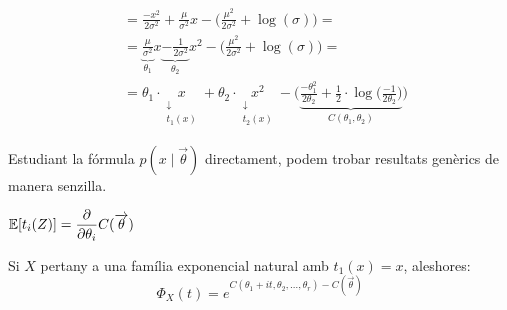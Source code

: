 \begin{example}
\begin{enumerate}
\[\begin{split}
          &= \frac{-x^{2}}{2\sigma^{2}} + \frac{\mu}{\sigma^{2}}x - \Big(\frac{\mu^{2}}{2\sigma^{2}}+\log(\sigma)\Big)= \\
          & = \underbrace{\frac{\mu}{\sigma^{2}}}_{\theta_{1}}x \underbrace{-\frac{1}{2\sigma^{2}}}_{\theta_{2}}x^{2} - \Big(\frac{\mu^{2}}{2\sigma^{2}}+\log(\sigma)\Big)= \\
          &= \theta_{1}\cdot\underset{\substack{\downarrow \\ t_{1}(x)}}{x} + \theta_{2}\cdot\underset{\substack{\downarrow \\ t_{2}(x)}}{x^{2}} - \bigg(\underbrace{\frac{-\theta_{1}^{2}}{2\theta_{2}}+\frac{1}{2}\cdot \log\Big(\frac{-1}{2\theta_{2}}\Big)}_{C(\theta_{1},\theta_{2})}\bigg)
      \end{split}
      \]
  \end{enumerate}
\end{example}

\newpage
Estudiant la fórmula $p(x\mid \overrightarrow{\theta})$ directament, podem trobar resultats genèrics de manera senzilla.

\begin{prop}
  $\mathbb{E}[t_{i}(Z)] = \dfrac{\partial}{\partial \theta_{i}}C(\overrightarrow{\theta})$
\end{prop}

\begin{prop}
  Si $X$ pertany a una família exponencial natural amb $t_{1}(x) = x$, aleshores:
  \[
    \Phi_{X}(t) = e^{C(\theta_{1}+it, \theta_{2},\ldots,\theta_{r})-C(\overrightarrow{\theta})}
  \]
\end{prop}
